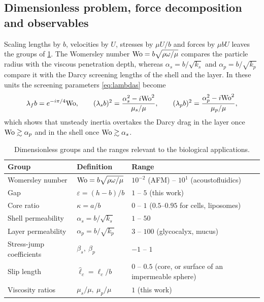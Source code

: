 \subsection{Dimensionless problem, force decomposition and observables}\label{sec:nondim}
Scaling lengths by $b$, velocities by $U$, stresses by $\mu U/b$ and forces by $\mu bU$ leaves the groups of
\cref{tab:groups}. The Womersley number $\mathrm{Wo}=b\sqrt{\rho\omega/\mu}$ compares the particle radius with the viscous
penetration depth, whereas $\alpha_s=b/\sqrt{k_s}$ and $\alpha_p=b/\sqrt{k_p}$ compare it with the Darcy screening lengths
of the shell and the layer. In these units the screening parameters \eqref{eq:lambdas} become
\begin{equation}
  \lambda_fb=e^{-i\pi/4}\mathrm{Wo},\qquad
  (\lambda_sb)^2=\frac{\alpha_s^2-i\mathrm{Wo}^2}{\mu_s/\mu},\qquad
  (\lambda_pb)^2=\frac{\alpha_p^2-i\mathrm{Wo}^2}{\mu_p/\mu},
  \label{eq:lambdas_nd}
\end{equation}
which shows that unsteady inertia overtakes the Darcy drag in the layer once $\mathrm{Wo}\gtrsim\alpha_p$ and in the shell once
$\mathrm{Wo}\gtrsim\alpha_s$.

\begin{table}[t]
\caption{Dimensionless groups and the ranges relevant to the biological applications.}
\label{tab:groups}
\begin{ruledtabular}
\begin{tabular}{lll}
Group & Definition & Range \\
\hline
Womersley number & $\mathrm{Wo}=b\sqrt{\rho\omega/\mu}$ & $10^{-2}$ (AFM) -- $10^{1}$ (acoustofluidics)\\
Gap & $\varepsilon=(h-b)/b$ & $1$ -- $5$ (this work)\\
Core ratio & $\kappa=a/b$ & $0$ -- $1$ ($0.5$--$0.95$ for cells, liposomes)\\
Shell permeability & $\alpha_s=b/\sqrt{k_s}$ & $1$ -- $50$\\
Layer permeability & $\alpha_p=b/\sqrt{k_p}$ & $3$ -- $100$ (glycocalyx, mucus)\\
Stress-jump coefficients & $\beta_s,\ \beta_p$ & $-1$ -- $1$\\
Slip length & $\hat\ell_c=\ell_c/b$ & $0$ -- $0.5$ (core, or surface of an impermeable sphere)\\
Viscosity ratios & $\mu_s/\mu,\ \mu_p/\mu$ & $1$ (this work)\\
\end{tabular}
\end{ruledtabular}
\end{table}

